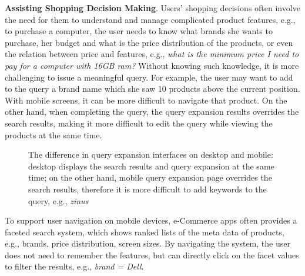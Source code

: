 \textbf{Assisting Shopping Decision Making}. Users' shopping decisions often involve the need for them to understand and manage complicated product features, e.g., to purchase a computer, the user needs to know what brands she wants to purchase, her budget and what is the price distribution of the products, or even the relation between price and features, e.g., \emph{what is the minimum price I need to pay for a computer with 16GB ram?} Without knowing such knowledge, it is more challenging to issue a meaningful query. For example, the user may want to add to the query a brand name which she saw 10 products above the current position. With mobile screens, it can be more difficult to navigate that product. On the other hand, when completing the query, the query expansion results overrides the search results, making it more difficult to edit the query while viewing the products at the same time. 

\begin{figure}[h]
\centering
{}\hfill
{}
\caption{The difference in query expansion interfaces on desktop and mobile: desktop displays the search results and query expansion at the same time; on the other hand, mobile query expansion page overrides the search results, therefore it is more difficult to add keywords to the query, e.g., \emph{zinus}}
\end{figure}

To support user navigation on mobile devices, e-Commerce apps often provides a faceted search system, which shows ranked lists of the meta data of products, e.g., brands, price distribution, screen sizes. By navigating the system, the user does not need to remember the features, but can directly click on the facet values to filter the results, e.g., \emph{brand = Dell}. 

